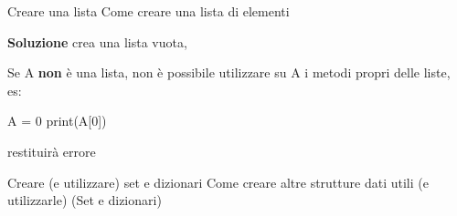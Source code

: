 \documentclass[10pt]{article}
\makeatletter
\newcommand{\<}{\langle}
\renewcommand{\>}{\rangle}
\renewenvironment{proof}[1][\proofname] {\par\pushQED{\qed}
\renewcommand*{\proofname}{Soluzione}
{\normalfont\sffamily\bfseries\topsep6\p@\@plus6\p@\relax #1\@addpunct{.} }}{\popQED\endtrivlist\@endpefalse}
\theoremstyle{mystyle}{\newtheorem*{remark}{Nota}}
\theoremstyle{mystyle}{\newtheorem*{remarks}{Note}}
\theoremstyle{mystyle}{\newtheorem*{example}{Esempio}}
\theoremstyle{mystyle}{\newtheorem*{examples}{Esempi}}
\theoremstyle{definition}{\newtheorem*{exercise}{Exercise}}
\theoremstyle{warn}
\makeatother
\begin{document}
\begin{definition}{Creare una lista}{}
Come creare una lista di elementi
\end{definition}
\begin{proof}
 crea una lista vuota, 
\end{proof}

\begin{remark}
Se A \textbf{non} è una lista, non è possibile utilizzare su A i metodi propri delle liste, es:
\begin{python}
A = 0
print(A[0])
\end{python}
restituirà errore
\end{remark}

\begin{definition}{Creare (e utilizzare) set e dizionari}{}
Come creare altre strutture dati utili (e utilizzarle) (Set e dizionari)
\end{definition}
\end{document}
